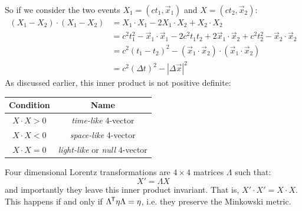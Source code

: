 \documentclass[../main.tex]{subfiles}
\begin{document}
So if we consider the two events $X_1 = (ct_1, \vec{x}_1)$ and $X = (ct_2, \vec{x}_2)$:
\begin{align*}
  (X_1 - X_2) \cdot (X_1 - X_2) &= X_1 \cdot X_1 - 2 X_1 \cdot X_2 + X_2 \cdot X_2 \\
                                &= c^2 t^2_1 - \vec{x}_1 \cdot \vec{x}_1 - 2c^2t_1t_2 + 2\vec{x}_1 \cdot \vec{x}_2 + c^2 t^2_2 - \vec{x}_2 \cdot \vec{x}_2\\
                                &= c^2(t_1 - t_2)^2 - (\vec{x}_1 \cdot \vec{x}_2) \cdot (\vec{x}_1 \cdot \vec{x}_2) \\
                                &= c^2(\Delta t)^2 - |\Delta \vec{x}|^2
\end{align*}
As discussed earlier, this inner product is not positive definite:
\begin{center}
\begin{tabular}{c|c}
Condition & Name \\
\hline
$X \cdot X > 0$ & \textit{time-like} 4-vector  \\
$X \cdot X < 0$ & \textit{space-like} 4-vector \\
$X \cdot X = 0$ & \textit{light-like} or \textit{null} 4-vector \\
\end{tabular}
\end{center}
Four dimensional Lorentz transformations are $4 \times 4$ matrices $\Lambda$ such that:
\[
  X' = \Lambda X
\]
and importantly they leave this inner product invariant.
That is, $X' \cdot X' = X \cdot X$.
This happens if and only if $\Lambda^{{\mkern-1.5mu\mathsf{T}}} \eta \Lambda = \eta$, i.e. they preserve the Minkowski metric.
\end{document}
